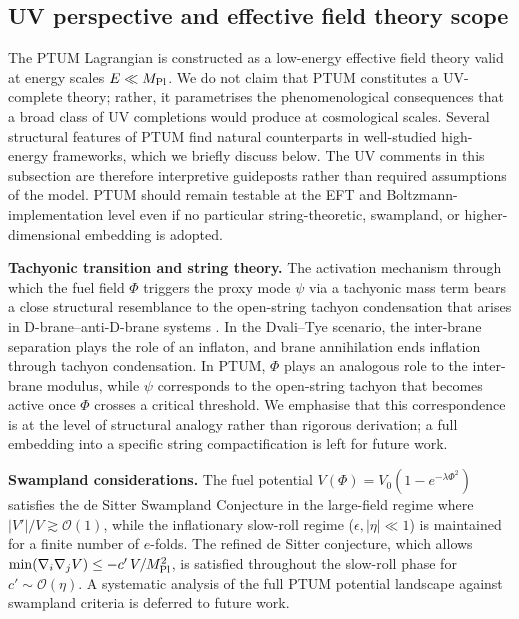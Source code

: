 \documentclass[epj]{svjour}
\begin{document}
\subsection{UV perspective and effective field theory scope}
\label{sec:uv_perspective}

The PTUM Lagrangian is constructed as a low-energy effective field
theory valid at energy scales $E \ll M_{\rm Pl}$. We do not claim
that PTUM constitutes a UV-complete theory; rather, it parametrises
the phenomenological consequences that a broad class of UV
completions would produce at cosmological scales. Several structural
features of PTUM find natural counterparts in well-studied
high-energy frameworks, which we briefly discuss below. The UV comments in
this subsection are therefore interpretive guideposts rather than required
assumptions of the model. PTUM should remain testable at the EFT and
Boltzmann-implementation level even if no particular string-theoretic,
swampland, or higher-dimensional embedding is adopted.

\noindent\textbf{Tachyonic transition and string theory.}
The activation mechanism through which the fuel field $\Phi$ triggers
the proxy mode $\psi$ via a tachyonic mass term bears a close
structural resemblance to the open-string tachyon condensation that
arises in D-brane--anti-D-brane systems
\cite{Sen2002,Dvali1999,KKLMMT2003}. In the Dvali--Tye scenario, the
inter-brane separation plays the role of an inflaton, and brane
annihilation ends inflation through tachyon condensation. In PTUM,
$\Phi$ plays an analogous role to the inter-brane modulus, while
$\psi$ corresponds to the open-string tachyon that becomes active
once $\Phi$ crosses a critical threshold. We emphasise that this
correspondence is at the level of structural analogy rather than
rigorous derivation; a full embedding into a specific string
compactification is left for future work.

\noindent\textbf{Swampland considerations.}
The fuel potential $V(\Phi) = V_0(1 - e^{-\lambda\Phi^2})$ satisfies
the de Sitter Swampland Conjecture \cite{Obied2018,Ooguri2019} in
the large-field regime where $|V'|/V \gtrsim \mathcal{O}(1)$, while
the inflationary slow-roll regime ($\epsilon, |\eta| \ll 1$) is
maintained for a finite number of $e$-folds. The refined de Sitter
conjecture, which allows $\min(\nabla_i \nabla_j V) \leq
-c'\,V/M_{\rm Pl}^2$, is satisfied throughout the slow-roll phase
for $c' \sim \mathcal{O}(\eta)$. A systematic analysis of the full
PTUM potential landscape against swampland criteria is deferred to
future work.
\end{document}
